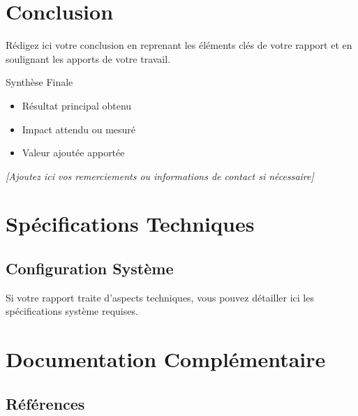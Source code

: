 \documentclass{modern-report}
\begin{document}
\chapter*{Conclusion}

Rédigez ici votre conclusion en reprenant les éléments clés de votre rapport et en soulignant les apports de votre travail.

\begin{modernbox}{Synthèse Finale}
\begin{itemize}
    \item Résultat principal obtenu
    \item Impact attendu ou mesuré
    \item Valeur ajoutée apportée
\end{itemize}
\end{modernbox}

\modernseparator

\textit{[Ajoutez ici vos remerciements ou informations de contact si nécessaire]}

\appendix

\chapter{Spécifications Techniques}

\section{Configuration Système}

Si votre rapport traite d'aspects techniques, vous pouvez détailler ici les spécifications système requises.

\chapter{Documentation Complémentaire}

\section{Références}
\end{document}
